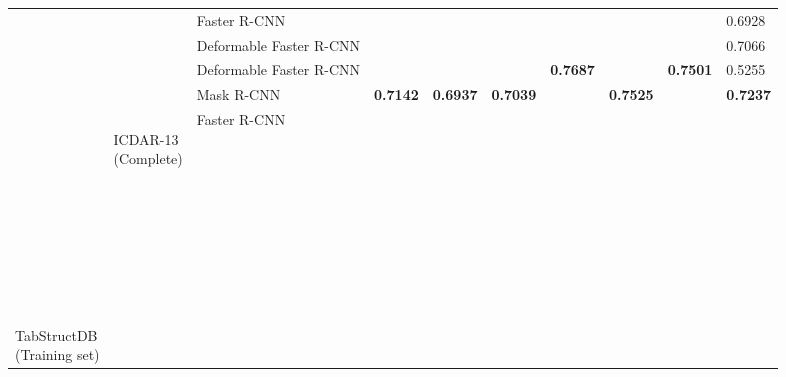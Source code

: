 \documentclass{ieeeaccess}
\begin{document}
\begin{table*}
\begin{tabularx}{\linewidth}{|u|u|t|v|v|k|v|v|k|k|}
        & \footnotesize {}&
        \footnotesize  Faster R-CNN&
        \footnotesize {}&
        \footnotesize {}&
        \footnotesize {}&
        \footnotesize {}&
        \footnotesize {}&
        \footnotesize {}&
        \footnotesize 
        {0.6928} \\
        & &\footnotesize  Deformable Faster R-CNN &
        
        \footnotesize {}&
        \footnotesize {}&
        \footnotesize {}&
        \footnotesize {}&
        \footnotesize {}&
        \footnotesize {}&
        \footnotesize {0.7066} \\
         & &\footnotesize  Deformable Faster R-CNN&
        \footnotesize {}&
        \footnotesize {}&
        \footnotesize {}&
        \footnotesize \centering \textbf{0.7687}&
        \footnotesize {}&
        \footnotesize \centering \textbf{0.7501}&
        \footnotesize {0.5255} \\
        & &\footnotesize  Mask R-CNN&
        \footnotesize \centering \textbf{0.7142}&
        \footnotesize \centering \textbf{0.6937}&
        \footnotesize \centering \textbf{0.7039}&
        \footnotesize {}&
        \footnotesize \centering \textbf{0.7525}&
        \footnotesize {}&
        \footnotesize 
        \textbf{0.7237} \\
        \hline


        \footnotesize {} {\newline \newline \newline\newline \newline \newline \newline \newline \newline \newline \newline TabStructDB \newline (Training set)}&
        \footnotesize {} {\newline ICDAR-13 \newline (Complete)}&
        \footnotesize  Faster R-CNN&
        

\end{tabularx}
\end{table*}
\end{document}
